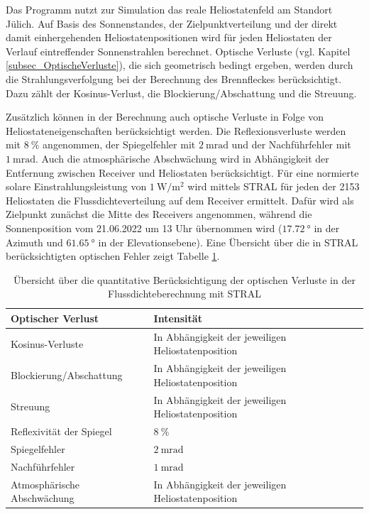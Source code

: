 Das Programm nutzt zur Simulation das reale Heliostatenfeld am Standort Jülich.
Auf Basis des Sonnenstandes, der Zielpunktverteilung und der direkt damit einhergehenden Heliostatenpositionen wird für jeden Heliostaten der Verlauf eintreffender Sonnenstrahlen berechnet.
Optische Verluste (vgl. Kapitel \ref{subsec_OptischeVerluste}), die sich geometrisch bedingt ergeben, werden durch die Strahlungsverfolgung bei der Berechnung des Brennfleckes berücksichtigt.
Dazu zählt der Kosinus-Verlust, die Blockierung/Abschattung und die Streuung.

Zusätzlich können in der Berechnung auch optische Verluste in Folge von Heliostateneigenschaften berücksichtigt werden.
Die Reflexionsverluste werden mit $\SI{8}{\percent}$ angenommen, der Spiegelfehler mit $\SI{2}{\milli\radian}$ und der Nachführfehler mit $\SI{1}{\milli\radian}$.
Auch die atmosphärische Abschwächung wird in Abhängigkeit der Entfernung zwischen Receiver und Heliostaten berücksichtigt.
Für eine normierte solare Einstrahlungsleistung von $\SI{1}{\watt\per\metre\squared}$ wird mittels STRAL für jeden der 2153 Heliostaten die Flussdichteverteilung auf dem Receiver ermittelt.
Dafür wird als Zielpunkt zunächst die Mitte des Receivers angenommen, während die Sonnenposition vom 21.06.2022 um 13 Uhr übernommen wird ($\SI{17.72}{\degree}$ in der Azimuth und $\SI{61.65}{\degree}$ in der Elevationsebene).
Eine Übersicht über die in STRAL berücksichtigten optischen Fehler zeigt Tabelle \ref{tab_optischeVerlustequantität}.

\begingroup
\renewcommand{\arraystretch}{1.2}
\begin{table}[ht!]
    \caption[Übersicht über die quantitative Berücksichtigung der optischen Verluste in der Flussdichteberechnung mit STRAL]{Übersicht über die quantitative Berücksichtigung der optischen Verluste in der Flussdichteberechnung mit STRAL}
    \centering
    \begin{tabular}{m{}m{}}
        \rowcolor{white}
        \toprule
        Optischer Verlust           & Intensität                                         \\
        \midrule
        Kosinus-Verluste            & In Abhängigkeit der jeweiligen Heliostatenposition \\
        Blockierung/Abschattung     & In Abhängigkeit der jeweiligen Heliostatenposition \\
        Streuung                    & In Abhängigkeit der jeweiligen Heliostatenposition \\
        Reflexivität der Spiegel    & $\SI{8}{\percent}$                                 \\
        Spiegelfehler               & $\SI{2}{\milli\radian}$                            \\
        Nachführfehler              & $\SI{1}{\milli\radian}$                            \\
        Atmosphärische Abschwächung & In Abhängigkeit der jeweiligen Heliostatenposition \\
        \toprule
    \end{tabular}
    \label{tab_optischeVerlustequantität}
\end{table}
\endgroup

